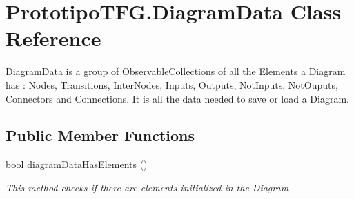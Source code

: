 \hypertarget{class_prototipo_t_f_g_1_1_diagram_data}{}\section{Prototipo\+T\+F\+G.\+Diagram\+Data Class Reference}
\label{class_prototipo_t_f_g_1_1_diagram_data}


\hyperlink{class_prototipo_t_f_g_1_1_diagram_data}{Diagram\+Data} is a group of Observable\+Collections of all the Elements a Diagram has \+: Nodes, Transitions, Inter\+Nodes, Inputs, Outputs, Not\+Inputs, Not\+Ouputs, Connectors and Connections. It is all the data needed to save or load a Diagram.  


\subsection*{Public Member Functions}
\begin{DoxyCompactItemize}
\item 
bool \hyperlink{class_prototipo_t_f_g_1_1_diagram_data_a81ea793d4ffb9c69dc468ccadc6f24ef}{diagram\+Data\+Has\+Elements} ()
\begin{DoxyCompactList}\small\item\em This method checks if there are elements initialized in the Diagram \end{DoxyCompactList}\end{DoxyCompactItemize}
